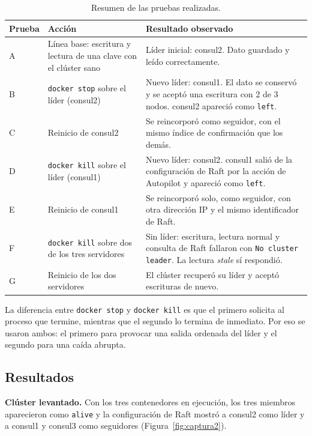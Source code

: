 \documentclass[12pt,a4paper]{article}
\begin{document}
\begin{table}[H]
  \centering
  \small
  \caption{Resumen de las pruebas realizadas.}
  \label{tab:pruebas}
  \begin{tabularx}{\textwidth}{>{\raggedright\arraybackslash}p{0.8cm}>{\raggedright\arraybackslash}p{4.6cm}>{\raggedright\arraybackslash}X}
    \toprule
    Prueba & Acción & Resultado observado \\
    \midrule
    A & Línea base: escritura y lectura de una clave con el clúster sano &
      Líder inicial: consul2. Dato guardado y leído correctamente. \\
    B & \texttt{docker stop} sobre el líder (consul2) &
      Nuevo líder: consul1. El dato se conservó y se aceptó una escritura con 2 de 3 nodos.
      consul2 apareció como \texttt{left}. \\
    C & Reinicio de consul2 &
      Se reincorporó como seguidor, con el mismo índice de confirmación que los demás. \\
    D & \texttt{docker kill} sobre el líder (consul1) &
      Nuevo líder: consul2. consul1 salió de la configuración de Raft por la acción de
      Autopilot y apareció como \texttt{left}. \\
    E & Reinicio de consul1 &
      Se reincorporó solo, como seguidor, con otra dirección IP y el mismo identificador de Raft. \\
    F & \texttt{docker kill} sobre dos de los tres servidores &
      Sin líder: escritura, lectura normal y consulta de Raft fallaron con
      \texttt{No cluster leader}. La lectura \textit{stale} sí respondió. \\
    G & Reinicio de los dos servidores &
      El clúster recuperó su líder y aceptó escrituras de nuevo. \\
    \bottomrule
  \end{tabularx}
\end{table}

La diferencia entre \texttt{docker stop} y \texttt{docker kill} es que el primero solicita al
proceso que termine, mientras que el segundo lo termina de inmediato. Por eso se usaron ambos:
el primero para provocar una salida ordenada del líder y el segundo para una caída abrupta.

\subsection{Resultados}

\textbf{Clúster levantado.} Con los tres contenedores en ejecución, los tres miembros aparecieron
como \texttt{alive} y la configuración de Raft mostró a consul2 como líder y a consul1 y consul3
como seguidores (Figura~\ref{fig:captura2}).
\end{document}
